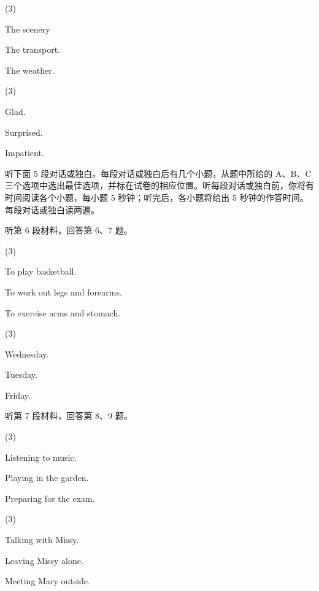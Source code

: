 \documentclass{英语试卷}
\begin{document}
\begin{choices}(3)
  \item The scenery
  \item The transport.
  \item The weather.
\end{choices}
\begin{choices}(3)
  \item Glad.
  \item Surprised.
  \item Impatient.
\end{choices}
\par 听下面 5 段对话或独白。每段对话或独白后有几个小题，从题中所给的 A、B、C 三个选项中选出最佳选项，并标在试卷的相应位置。听每段对话或独白前，你将有时间阅读各个小题，每小题 5 秒钟；听完后，各小题将给出 5 秒钟的作答时间。每段对话或独白读两遍。\par
\par 听第 6 段材料，回答第 6、7 题。\par
{}
\begin{choices}(3)
  \item To play basketball.
  \item To work out legs and forearms.
  \item To exercise arms and stomach.
\end{choices}
\begin{choices}(3)
  \item Wednesday.
  \item Tuesday.
  \item Friday.
\end{choices}
\par 听第 7 段材料，回答第 8、9 题。\par
{}
\begin{choices}(3)
  \item Listening to music.
  \item Playing in the garden.
  \item Preparing for the exam.
\end{choices}
\begin{choices}(3)
  \item Talking with Missy.
  \item Leaving Missy alone.
  \item Meeting Mary outside.
\end{choices}
\end{document}
